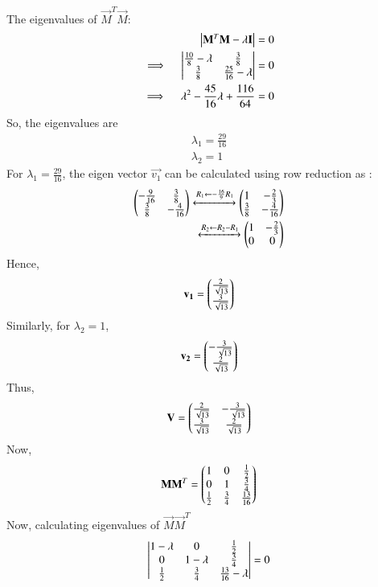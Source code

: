 \documentclass[journal,12pt,twocolumn]{IEEEtran}
\begin{document}
The eigenvalues of $\vec{M}^T\vec{M}$:
\begin{align}
	\begin{vmatrix}\mathbf{M}^T\mathbf{M}-\lambda \mathbf{I}\end{vmatrix} = 0 \\
	\implies \quad
	\begin{vmatrix}\frac{10}{8}-\lambda & \frac{3}{8} \\ \frac{3}{8} & \frac{25}{16}-\lambda \end{vmatrix} = 0 \\
	\implies \quad
	\lambda^2 - \frac{45}{16}\lambda + \frac{116}{64} = 0
\end{align}
	So, the eigenvalues are 
\begin{align}
	\lambda_1 = \frac{29}{16}	\\
	\lambda_2 = 1
\end{align}
For $\lambda_1 = \frac{29}{16}$, the eigen vector $\vec{v_1}$ can be calculated using row reduction as :
\begin{align}
	\begin{pmatrix}-\frac{9}{16} & \frac{3}{8} \\ \frac{3}{8} & -\frac{4}{16}\end{pmatrix} 
	\xleftrightarrow[]{R_1 \leftarrow - \frac{16}{9}R_1}
	\begin{pmatrix}1 & -\frac{2}{3} \\ \frac{3}{8} & -\frac{4}{16}\end{pmatrix} \\
	\xleftrightarrow[]{R_2 \leftarrow R_2-R_1}
	\begin{pmatrix}1 & -\frac{2}{3} \\ 0 & 0\end{pmatrix} 
\end{align}
Hence, 
\begin{align}
	\mathbf{v_1}= \begin{pmatrix}\frac{2}{\sqrt{13}} \\ \frac{3}{\sqrt{13}}\end{pmatrix}
\end{align}
Similarly, for $\lambda_2=1$, 
\begin{align}
	\mathbf{v_2}= \begin{pmatrix}-\frac{3}{\sqrt{13}} \\ \frac{2}{\sqrt{13}}\end{pmatrix}
\end{align}
Thus, 
\begin{align}
	\mathbf{V}= \begin{pmatrix}\frac{2}{\sqrt{13}} & -\frac{3}{\sqrt{13}} \\
		\frac{3}{\sqrt{13}} & \frac{2}{\sqrt{13}} \end{pmatrix}
\end{align}
Now, 
\begin{align}
	\mathbf{M}\mathbf{M}^T = 
	\begin{pmatrix}1 & 0 & \frac{1}{2} \\ 0 & 1 & \frac{3}{4} \\
		\frac{1}{2} & \frac{3}{4} & \frac{13}{16} \end{pmatrix}
\end{align}
Now, calculating eigenvalues of $\vec{M}\vec{M}^T$
\begin{align}
	\begin{vmatrix}1-\lambda & 0 & \frac{1}{2} \\ 0 & 1-\lambda & \frac{3}{4} \\
		\frac{1}{2} & \frac{3}{4} & \frac{13}{16}-\lambda \end{vmatrix} = 0  
\end{align}
\end{document}
